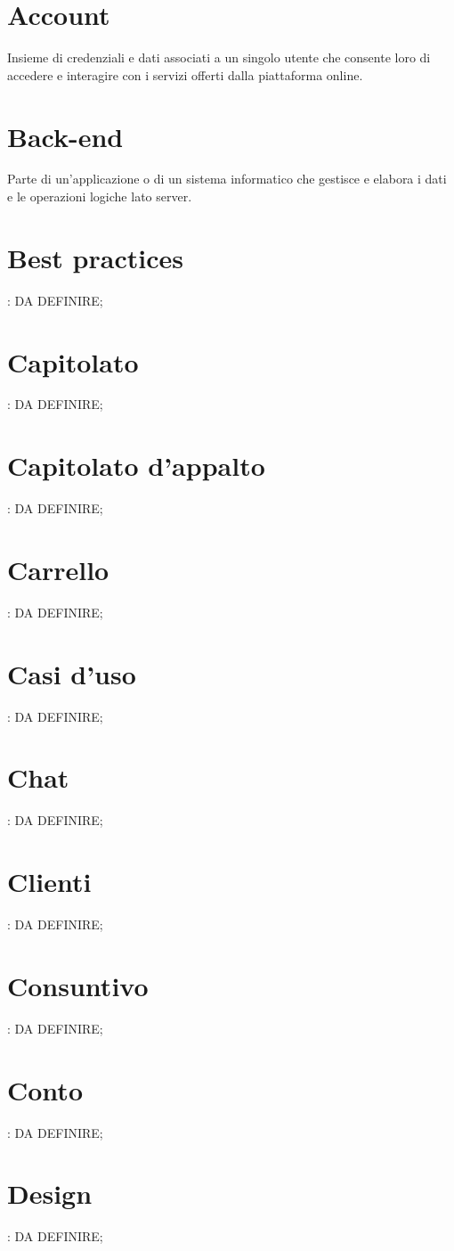 \section{Account}
Insieme di credenziali e dati associati a un singolo utente che consente loro di accedere e interagire con i servizi offerti dalla piattaforma online.

\section{Back-end}
Parte di un'applicazione o di un sistema informatico che gestisce e elabora i dati e le operazioni logiche lato server.

\section{Best practices}: DA DEFINIRE;
\section{Capitolato}: DA DEFINIRE;
\section{Capitolato d’appalto}: DA DEFINIRE;
\section{Carrello}: DA DEFINIRE;
\section{Casi d’uso}: DA DEFINIRE;
\section{Chat}: DA DEFINIRE;
\section{Clienti}: DA DEFINIRE;
\section{Consuntivo}: DA DEFINIRE;
\section{Conto}: DA DEFINIRE;
\section{Design}: DA DEFINIRE;
